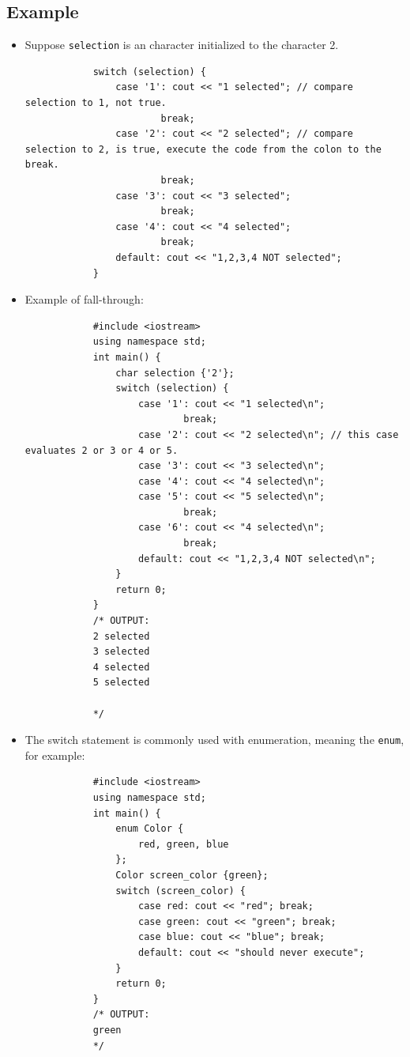 \subsection{Example}
\begin{itemize}
    \item Suppose \texttt{selection} is an character initialized to the character 2.
        \begin{verbatim}
            switch (selection) {
                case '1': cout << "1 selected"; // compare selection to 1, not true.
                        break;
                case '2': cout << "2 selected"; // compare selection to 2, is true, execute the code from the colon to the break.
                        break;
                case '3': cout << "3 selected";
                        break;
                case '4': cout << "4 selected";
                        break;
                default: cout << "1,2,3,4 NOT selected";
            }
        \end{verbatim}
    
    \item Example of fall-through:
        \begin{verbatim}
            #include <iostream>
            using namespace std;
            int main() {
                char selection {'2'};
                switch (selection) {
                    case '1': cout << "1 selected\n";
                            break;
                    case '2': cout << "2 selected\n"; // this case evaluates 2 or 3 or 4 or 5.
                    case '3': cout << "3 selected\n";
                    case '4': cout << "4 selected\n";
                    case '5': cout << "5 selected\n";
                            break;
                    case '6': cout << "4 selected\n";
                            break;
                    default: cout << "1,2,3,4 NOT selected\n";
                }
                return 0;
            }
            /* OUTPUT:
            2 selected
            3 selected
            4 selected
            5 selected

            */
        \end{verbatim}
    
    \item The switch statement is commonly used with enumeration, meaning the \texttt{enum}, for example: 
        \begin{verbatim}
            #include <iostream>
            using namespace std;
            int main() {
                enum Color {
                    red, green, blue
                };
                Color screen_color {green};
                switch (screen_color) {
                    case red: cout << "red"; break;
                    case green: cout << "green"; break;
                    case blue: cout << "blue"; break;
                    default: cout << "should never execute";
                }
                return 0;
            }
            /* OUTPUT:
            green
            */
        \end{verbatim}
\end{itemize}

